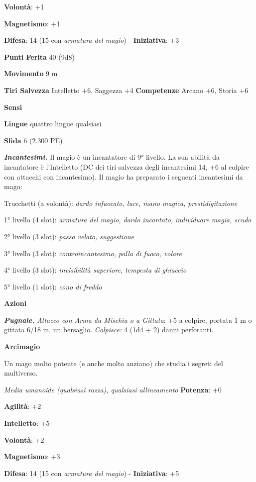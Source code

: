 \begin{multicols}{2}
\textbf{Volontà}: +1

\textbf{Magnetismo}: +1

\textbf{Difesa}: 14 (15 con \emph{armatura del magio}) - \textbf{Iniziativa}: +3

\textbf{Punti Ferita} 40 (9d8)

\textbf{Movimento} 9 m

\textbf{Tiri Salvezza} Intelletto +6, Saggezza +4 \textbf{Competenze}
Arcano +6, Storia +6

\textbf{Sensi} 

\textbf{Lingue} quattro lingue qualsiasi

\textbf{Sfida} 6 (2.300 PE)\smallskip

\emph{\textbf{Incantesimi.}} Il magio è un incantatore di 9° livello. La
sua abilità da incantatore è l'Intelletto (DC dei tiri salvezza degli
incantesimi 14, +6 al colpire con attacchi con incantesimo). Il magio ha
preparato i seguenti incantesimi da mago:

Trucchetti (a volontà): \emph{dardo infuocato, luce, mano magica,}
\emph{prestidigitazione}

1° livello (4 slot): \emph{armatura del magio, dardo incantato,}
\emph{individuare magia, scudo}

2° livello (3 slot): \emph{passo velato, suggestione}

3° livello (3 slot): \emph{controincantesimo, palla di fuoco, volare}

4° livello (3 slot): \emph{invisibilità superiore, tempesta di ghiaccio}

5° livello (1 slot): \emph{cono di freddo}

\smallskip\textbf{Azioni}

\emph{\textbf{Pugnale.} Attacco con Arma da Mischia o a Gittata}: +5 a
colpire, portata 1 m o gittata 6/18 m, un bersaglio. \emph{Colpisce:}
4 (1d4 + 2) danni perforanti.




\textbf{Arcimagio}

Un mago molto potente (e anche molto anziano) che studia i segreti del
multiverso.

\emph{Media umanoide (qualsiasi razza), qualsiasi allineamento}
\textbf{Potenza}: +0

\textbf{Agilità}: +2

\textbf{Intelletto}: +5

\textbf{Volontà}: +2

\textbf{Magnetismo}: +3

\textbf{Difesa}: 14 (15 con \emph{armatura del magio}) - \textbf{Iniziativa}: +5


\end{multicols}

